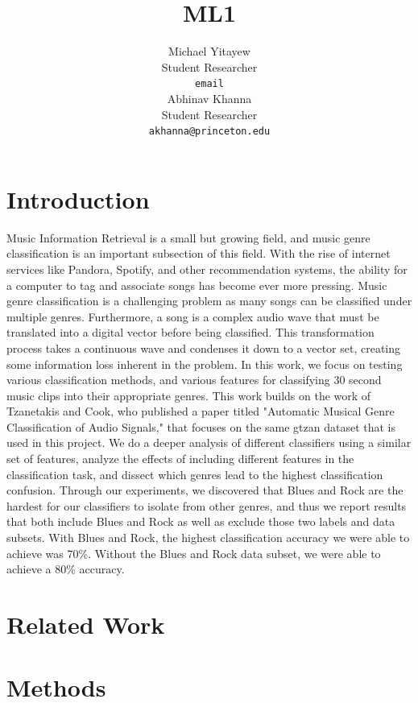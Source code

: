 \documentclass{article} %
\title{ML1}
\author{
Michael Yitayew\\
Student Researcher\\
\texttt{email} \\
\And
Abhinav Khanna \\
Student Researcher \\
\texttt{akhanna@princeton.edu} \\
}
\begin{document}
\maketitle

\begin{abstract}

\end{abstract}

\section{Introduction}

Music Information Retrieval is a small but growing field, and music genre classification is an important subsection of this field. With the rise of internet services like Pandora, Spotify, and other recommendation systems, the ability for a computer to tag and associate songs has become ever more pressing. Music genre classification is a challenging problem as many songs can be classified under multiple genres. Furthermore, a song is a complex audio wave that must be translated into a digital vector before being classified. This transformation process takes a continuous wave and condenses it down to a vector set, creating some information loss inherent in the problem. In this work, we focus on testing various classification methods, and various features for classifying 30 second music clips into their appropriate genres. This work builds on the work of Tzanetakis and Cook, who published a paper titled "Automatic Musical Genre Classification of Audio Signals," that focuses on the same gtzan dataset that is used in this project. We do a deeper analysis of different classifiers using a similar set of features, analyze the effects of including different features in the classification task, and dissect which genres lead to the highest classification confusion. Through our experiments, we discovered that Blues and Rock are the hardest for our classifiers to isolate from other genres, and thus we report results that both include Blues and Rock as well as exclude those two labels and data subsets. With Blues and Rock, the highest classification accuracy we were able to achieve was 70\%. Without the Blues and Rock data subset, we were able to achieve a 80\% accuracy. 

\section{Related Work}

\section{Methods}
\end{document}
